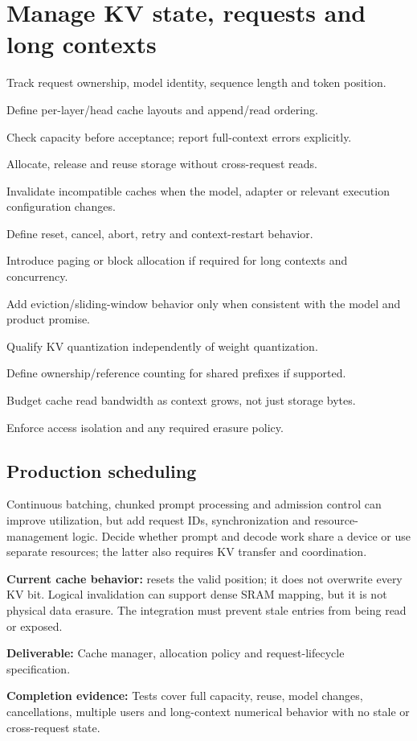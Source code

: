 \documentclass[11pt,a4paper]{article}
\newcommand{\code}[1]{\texttt{\detokenize{#1}}}
\newcommand{\phase}[2]{\clearpage\section{#1}\label{#2}}
\newcommand{\deliver}[2]{\begin{tcolorbox}[colback=pale,colframe=line,boxrule=0.5pt,arc=1mm,left=8pt,right=8pt,top=6pt,bottom=6pt]\textbf{Deliverable:} #1\par\textbf{Completion evidence:} #2\end{tcolorbox}}
\newcommand{\note}[1]{\begin{tcolorbox}[colback=pale,colframe=teal,boxrule=0.6pt,arc=1mm,left=8pt,right=8pt,top=6pt,bottom=6pt]#1\end{tcolorbox}}
\begin{document}
\phase{Manage KV state, requests and long contexts}{sec:kv}
\begin{checklist}
\item Track request ownership, model identity, sequence length and token position.
\item Define per-layer/head cache layouts and append/read ordering.
\item Check capacity before acceptance; report full-context errors explicitly.
\item Allocate, release and reuse storage without cross-request reads.
\item Invalidate incompatible caches when the model, adapter or relevant execution configuration changes.
\item Define reset, cancel, abort, retry and context-restart behavior.
\item Introduce paging or block allocation if required for long contexts and concurrency.
\item Add eviction/sliding-window behavior only when consistent with the model and product promise.
\item Qualify KV quantization independently of weight quantization.
\item Define ownership/reference counting for shared prefixes if supported.
\item Budget cache read bandwidth as context grows, not just storage bytes.
\item Enforce access isolation and any required erasure policy.
\end{checklist}
\subsection*{Production scheduling}
Continuous batching, chunked prompt processing and admission control can improve
utilization, but add request IDs, synchronization and resource-management logic.
Decide whether prompt and decode work share a device or use separate resources;
the latter also requires KV transfer and coordination.

\note{\textbf{Current cache behavior:} \code{clear_cache} resets the valid position;
it does not overwrite every KV bit. Logical invalidation can support dense SRAM
mapping, but it is not physical data erasure. The integration must prevent stale
entries from being read or exposed.}

\deliver{Cache manager, allocation policy and request-lifecycle specification.}{Tests
cover full capacity, reuse, model changes, cancellations, multiple users and
long-context numerical behavior with no stale or cross-request state.}
\end{document}
